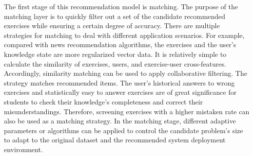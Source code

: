 The first stage of this recommendation model is matching. The purpose of the matching layer is to quickly filter out a set of the candidate recommended exercises while ensuring a certain degree of accuracy. There are multiple strategies for matching to deal with different application scenarios. For example, compared with news recommendation algorithms, the exercises and the user's knowledge state are more regularized vector data. It is relatively simple to calculate the similarity of exercises, users, and exercise-user cross-features. Accordingly, similarity matching can be used to apply collaborative filtering. The strategy matches recommended items. The user's historical answers to wrong exercises and statistically easy to answer exercises are of great significance for students to check their knowledge's completeness and correct their misunderstandings. Therefore, screening exercises with a higher mistaken rate can also be used as a matching strategy. In the matching stage, different adaptive parameters or algorithms can be applied to control the candidate problem's size to adapt to the original dataset and the recommended system deployment environment.

